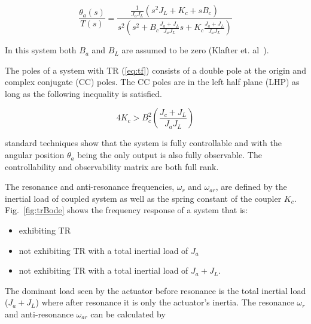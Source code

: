 \begin{equation}\label{eq:tf}
\frac{\theta_a(s)}{T(s)} = \frac{  \frac{1}{J_aJ_L}\left(s^2J_L+K_c + sB_c\right)  }{s^2 \left( s^2+B_c\frac{J_a+J_L}{J_aJ_L} s + K_c \frac{J_a+J_L}{J_aJ_L} \right)}
\end{equation}

In this system both $B_a$ and $B_L$ are assumed to be zero (Klafter et. al~\cite{chmielewski}).









The poles of a system with TR (\ref{eq:tf}) consists of a double pole at the origin and complex conjugate (CC) poles.  The CC poles are in the left half plane (LHP) as long as the following inequality is satisfied.

\begin{equation}
4K_c > B_c^2 \left( \frac{J_c+J_L}{J_aJ_L} \right)
\end{equation}





\noindent standard techniques show that the system is fully controllable and with the angular position $\theta_a$ being the only output is also fully observable.  The controllability and observability matrix are both full rank.



The resonance and anti-resonance frequencies, $\omega_r$ and $\omega_{ar}$, are defined by the inertial load of coupled system as well as the spring constant of the coupler $K_c$.
Fig.~\ref{fig:trBode} shows the frequency response of a system that is:
\begin{itemize}
\item exhibiting TR
\item not exhibiting TR with a total inertial load of $J_a$
\item not exhibiting TR with a total inertial load of $J_a+J_L$.  
\end{itemize}
The dominant load seen by the actuator before resonance is the total inertial load ($J_a+J_L$) where after resonance it is only the actuator's inertia.  The resonance $\omega_r$ and anti-resonance $\omega_{ar}$ can be calculated by


